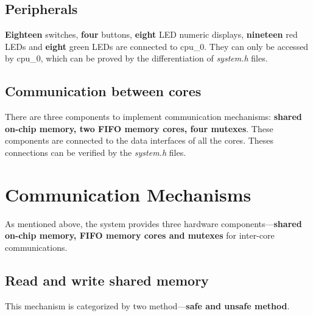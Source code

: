 \documentclass[conference]{IEEEtran}
\begin{document}
\subsection{Peripherals}
\textbf{Eighteen} switches, \textbf{four} buttons, \textbf{eight} LED numeric displays, \textbf{nineteen} red LEDs and \textbf{eight} green LEDs are connected to cpu\_0. They can only be accessed by cpu\_0, which can be proved by the differentiation of \emph{system.h} files.
\subsection{Communication between cores}
There are three components to implement communication mechanisms: \textbf{shared on-chip memory, two FIFO memory cores, four mutexes}. These components are connected to the data interfaces of all the cores. Theses connections can be verified by the \emph{system.h} files.

\section{Communication Mechanisms}
As mentioned above, the system provides three hardware components---\textbf{shared on-chip memory, FIFO memory cores and mutexes} for inter-core communications.
\subsection{Read and write shared memory}
This mechanism is categorized by two method---\textbf{safe and unsafe  method}.
\end{document}
